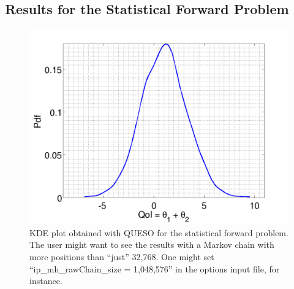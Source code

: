 \clearpage

\subsection{Results for the Statistical Forward Problem}

\begin{figure}[h!]
\centerline{
\includegraphics[scale=0.45,clip=true,viewport=0.0in 0.0in 8.0in 7.0in]{figs/paper_plot5}
}
\caption{
KDE plot obtained with QUESO for the statistical forward problem.
The user might want to see the results with a Markov chain with more positions than ``just'' 32,768. One might set ``ip\_mh\_rawChain\_size = 1,048,576'' in the options input file, for instance.
}
\label{fig-sfp-hist-kde-plots}
\end{figure}


